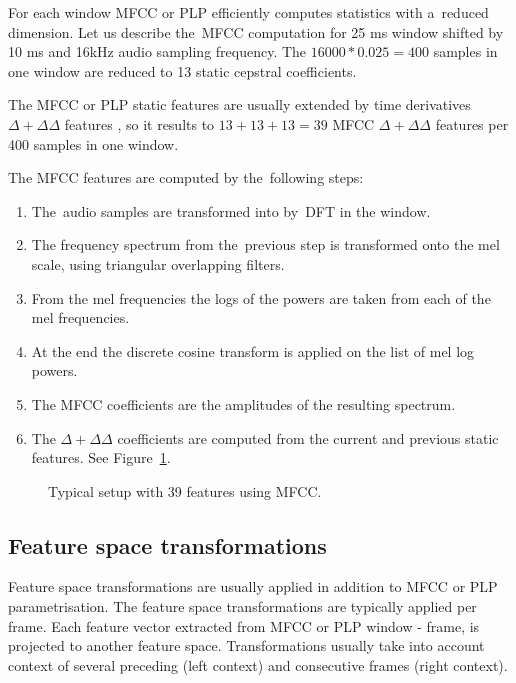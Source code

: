 For each window \ac{MFCC} or \ac{PLP} efficiently computes statistics with a~reduced dimension. 
Let us describe the~\ac{MFCC} computation for 25 ms window shifted by 10 ms and 16kHz audio sampling frequency. 
The $16000 * 0.025 = 400$ samples in one window are reduced to 13 static cepstral coefficients.

The \ac{MFCC} or \ac{PLP} static features are usually extended 
by time derivatives $\Delta+\Delta\Delta$ features \cite{psutka2001comparison},
so it results to $13 + 13 + 13 = 39$ \ac{MFCC} $\Delta+\Delta\Delta$ features 
per 400 samples in one window.

The \ac{MFCC} features are computed by the~following steps:

\small{\begin{enumerate}
    \item The~audio samples are transformed into  by~\ac{DFT} in the window.
    \item The frequency spectrum from the~previous step is transformed onto the mel scale, 
        using triangular overlapping filters.
    \item From the mel frequencies the logs of the powers are taken from each of the mel frequencies.
    \item At the end the discrete cosine transform is applied on the list of mel log powers.
    \item The \ac{MFCC} coefficients are the amplitudes of the resulting spectrum.
    \item The $\Delta+\Delta\Delta$ coefficients are computed from the current and previous static features. See Figure~\ref{fig:delta}.
\end{enumerate}

\begin{figure}
    \begin{center}
    
    \caption{Typical setup with 39 features using \ac{MFCC}.}
    \label{fig:delta} 
    \end{center}
\end{figure}

\subsection*{Feature space transformations}
Feature space transformations are usually applied in addition to \ac{MFCC} or \ac{PLP} parametrisation.
The feature space transformations are typically applied per frame. 
Each feature vector extracted from \ac{MFCC} or \ac{PLP} window - frame, is projected to another feature space.
Transformations usually take into account context of several preceding (left context) and consecutive frames (right context).

}
